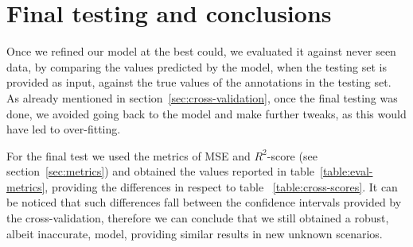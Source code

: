 \section{Final testing and conclusions}\label{sec:conclusions}

Once we refined our model at the best could, we evaluated it against never seen data, by comparing the values predicted by the model, when the testing set is provided as input, against the true values of the annotations in the testing set. As already mentioned in section~\ref{sec:cross-validation}, once the final testing was done, we avoided going back to the model and make further tweaks, as this would have led to over-fitting.

\begin{table}
	\centering
	\caption{Final evaluation metrics}
	\label{table:eval-metrics}
\end{table}

For the final test we used the metrics of MSE and $R^2$-score (see section~\ref{sec:metrics}) and obtained the values reported in table~\ref{table:eval-metrics}, providing the differences in respect to table ~\ref{table:cross-scores}. It can be noticed that such differences fall between the confidence intervals provided by the cross-validation, therefore we can conclude that we still obtained a robust, albeit inaccurate, model, providing similar results in new unknown scenarios.

